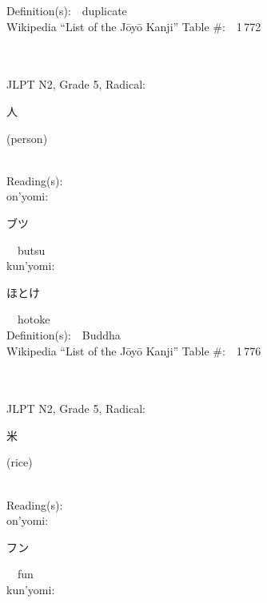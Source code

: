 \begin{multicols}{2}
Definition(s):\ \ duplicate \\
Wikipedia ``List of the J\=oy\=o Kanji'' Table \#:\ \ 1\,772 \\
\ \ \\
{\fontsize{34pt}{40pt}  }\ \ \\  %
{JLPT N2, Grade 5, Radical:\ \ {\begin{CJK}{UTF8}{min} 人 \end{CJK}} (person) } \\
Reading(s):\ \ \\
{\hspace*{1em}}on'yomi:\ \ \\
{\hspace*{2em}}{\begin{CJK}{UTF8}{min} ブツ \end{CJK}}\ \ butsu\ \ \\
{\hspace*{1em}}kun'yomi:\ \ \\
{\hspace*{2em}}{\begin{CJK}{UTF8}{min} ほとけ \end{CJK}}\ \ hotoke\ \ \\
Definition(s):\ \ Buddha \\
Wikipedia ``List of the J\=oy\=o Kanji'' Table \#:\ \ 1\,776 \\
\ \ \\
{\fontsize{34pt}{40pt}  }\ \ \\  %
{JLPT N2, Grade 5, Radical:\ \ {\begin{CJK}{UTF8}{min} 米 \end{CJK}} (rice) } \\
Reading(s):\ \ \\
{\hspace*{1em}}on'yomi:\ \ \\
{\hspace*{2em}}{\begin{CJK}{UTF8}{min} フン \end{CJK}}\ \ fun\ \ \\
{\hspace*{1em}}kun'yomi:\ \ \\

\end{multicols}
